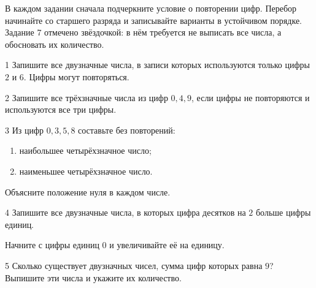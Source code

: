 
\studentline

\begin{routebox}
  В каждом задании сначала подчеркните условие о повторении цифр. Перебор
  начинайте со старшего разряда и записывайте варианты в устойчивом порядке.
  Задание 7 отмечено звёздочкой: в нём требуется не выписать все числа, а
  обосновать их количество.
\end{routebox}

\begin{homeworktask}{1}
  Запишите все двузначные числа, в записи которых используются только цифры
  \(2\) и \(6\). Цифры могут повторяться.
  \answerspace{18mm}
\end{homeworktask}

\begin{homeworktask}{2}
  Запишите все трёхзначные числа из цифр \(0,4,9\), если цифры не
  повторяются и используются все три цифры.
  \answerspace{22mm}
\end{homeworktask}

\begin{homeworktask}{3}
  Из цифр \(0,3,5,8\) составьте без повторений:
  \begin{enumerate}
    \item наибольшее четырёхзначное число;
    \item наименьшее четырёхзначное число.
  \end{enumerate}
  Объясните положение нуля в каждом числе.
  \answerspace{25mm}
\end{homeworktask}

\begin{homeworktask}{4}
  Запишите все двузначные числа, в которых цифра десятков на \(2\) больше
  цифры единиц.
  \begin{hintbox}
    Начните с цифры единиц \(0\) и увеличивайте её на единицу.
  \end{hintbox}
  \answerspace{22mm}
\end{homeworktask}

\begin{homeworktask}{5}
  Сколько существует двузначных чисел, сумма цифр которых равна \(9\)?
  Выпишите эти числа и укажите их количество.
  \answerspace{28mm}
\end{homeworktask}


